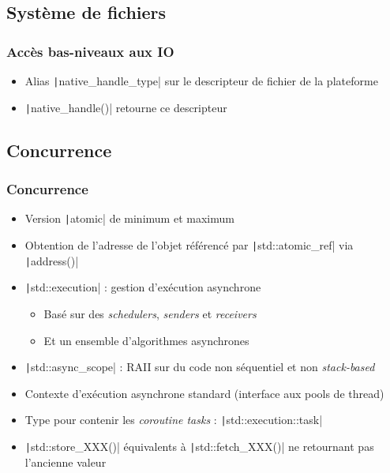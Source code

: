 \documentclass[C++.tex]{subfiles}
\begin{document}
\subsection*{Système de fichiers}
\begin{frame}[fragile]
	\frametitle{Accès bas-niveaux aux IO}
	\begin{itemize}
		\item Alias \texttt|native_handle_type| sur le descripteur de fichier de la plateforme
		\item \texttt|native_handle()| retourne ce descripteur
	\end{itemize}

\end{frame}

\subsection*{Concurrence}
\begin{frame}[fragile]
	\frametitle{Concurrence}
	\begin{itemize}
		\item Version \texttt|atomic| de minimum et maximum
		\item Obtention de l'adresse de l'objet référencé par \texttt|std::atomic_ref| via \texttt|address()|
		\item \texttt|std::execution| : gestion d'exécution asynchrone
		\begin{itemize}
			\item Basé sur des \textit{schedulers}, \textit{senders} et \textit{receivers}
			\item Et un ensemble d'algorithmes asynchrones
		\end{itemize}
		\item \texttt|std::async_scope| : RAII sur du code non séquentiel et non \textit{stack-based}
		\item Contexte d'exécution asynchrone standard (interface aux pools de thread)
		\item Type pour contenir les \textit{coroutine tasks} : \texttt|std::execution::task|
		\item \texttt|std::store_XXX()| équivalents à \texttt|std::fetch_XXX()| ne retournant pas l'ancienne valeur
	\end{itemize}

\end{frame}
\end{document}
